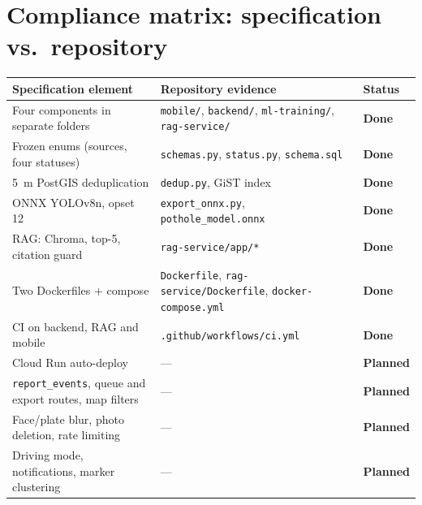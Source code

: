 \documentclass[11pt,a4paper,oneside]{report}
\newcommand{\sDone}{\textcolor{okgreen}{\textbf{Done}}}
\newcommand{\sPlan}{\textcolor{planblue}{\textbf{Planned}}}
\begin{document}
\section{Compliance matrix: specification vs.\ repository}
\begin{longtable}{@{}L{6.4cm}L{5.8cm}L{1.8cm}@{}}
\toprule\textbf{Specification element} & \textbf{Repository evidence} & \textbf{Status}\\\midrule\endhead
Four components in separate folders & \texttt{mobile/}, \texttt{backend/}, \texttt{ml-training/}, \texttt{rag-service/} & \sDone\\
Frozen enums (sources, four statuses) & \texttt{schemas.py}, \texttt{status.py}, \texttt{schema.sql} & \sDone\\
5~m PostGIS deduplication & \texttt{dedup.py}, GiST index & \sDone\\
ONNX YOLOv8n, opset 12 & \texttt{export\_onnx.py}, \texttt{pothole\_model.onnx} & \sDone\\
RAG: Chroma, top-5, citation guard & \texttt{rag-service/app/*} & \sDone\\
Two Dockerfiles + compose & \texttt{Dockerfile}, \texttt{rag-service/Dockerfile}, \texttt{docker-compose.yml} & \sDone\\
CI on backend, RAG and mobile & \texttt{.github/workflows/ci.yml} & \sDone\\
Cloud Run auto-deploy & --- & \sPlan\\
\texttt{report\_events}, queue and export routes, map filters & --- & \sPlan\\
Face/plate blur, photo deletion, rate limiting & --- & \sPlan\\
Driving mode, notifications, marker clustering & --- & \sPlan\\\bottomrule
\end{longtable}
\end{document}
